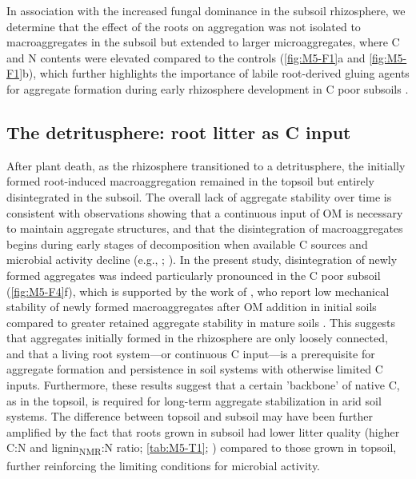 In association with the increased fungal dominance in the subsoil rhizosphere, we determine that the effect of the roots on aggregation was not isolated to macroaggregates in the subsoil but extended to larger microaggregates, where C and N contents were elevated compared to the controls (\ref{fig:M5-F1}a and \ref{fig:M5-F1}b), which further highlights the importance of labile root-derived gluing agents for aggregate formation during early rhizosphere development in C poor subsoils \citep{Baumert2018}.

\subsection{The detritusphere: root litter as C input}

After plant death, as the rhizosphere transitioned to a detritusphere, the initially formed root-induced macroaggregation remained in the topsoil but entirely disintegrated in the subsoil. The overall lack of aggregate stability over time is consistent with observations showing that a continuous input of OM is necessary to maintain aggregate structures, and that the disintegration of macroaggregates begins during early stages of decomposition when available C sources and microbial activity decline (e.g., \citep{Golchin1997}; \citep{Helfrich2008}). In the present study, disintegration of newly formed aggregates was indeed particularly pronounced in the C poor subsoil (\ref{fig:M5-F4}f), which is supported by the work of \citet{Bucka2021}, who report low mechanical stability of newly formed macroaggregates after OM addition in initial soils compared to greater retained aggregate stability in mature soils \citep{Felde2020}. This suggests that aggregates initially formed in the rhizosphere are only loosely connected, and that a living root system---or continuous C input---is a prerequisite for aggregate formation and persistence in soil systems with otherwise limited C inputs. Furthermore, these results suggest that a certain 'backbone' of native C, as in the topsoil, is required for long-term aggregate stabilization in arid soil systems. The difference between topsoil and subsoil may have been further amplified by the fact that roots grown in subsoil had lower litter quality (higher C:N and lignin\textsubscript{NMR}:N ratio; \ref{tab:M5-T1}; \citep{Walela2014}) compared to those grown in topsoil, further reinforcing the limiting conditions for microbial activity.

